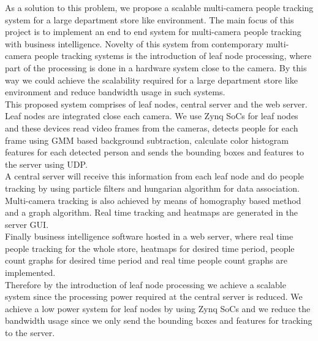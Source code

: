\documentclass[12pt,a4paper]{report}
\begin{document}
As a solution to this problem, we propose a scalable multi-camera people tracking system for a large department store like environment. The main focus of this project is to implement an end to end system for multi-camera people tracking with business intelligence.
Novelty of this system from contemporary multi-camera people tracking systems is the introduction of leaf node processing, where part of the processing is done in a hardware system close to the camera. By this way we could achieve the scalability required for a large department store like environment and reduce bandwidth usage in such systems.\\
This proposed system comprises of leaf nodes, central server and the web server. Leaf nodes are integrated close each camera. We use Zynq SoCs for leaf nodes and these devices read video frames from the cameras, detects people for each frame using GMM based background subtraction, calculate color histogram features for each detected person and sends the bounding boxes and features to the server using UDP.\\
A central server will receive this information from each leaf node and do people tracking by using particle filters and hungarian algorithm for data association. Multi-camera tracking is also achieved by means of homography based method and a graph algorithm. Real time tracking and heatmaps are generated in the server GUI.\\
Finally business intelligence software hosted in a web server, where real time people tracking for the whole store, heatmaps for desired time period, people count graphs for desired time period and real time people count graphs are implemented.\\
Therefore by the introduction of leaf node processing we achieve a scalable system since the processing power required at the central server is reduced. We achieve a low power system for leaf nodes by using Zynq SoCs and we reduce the bandwidth usage since we only send the bounding boxes and features for tracking to the server.
\end{document}
